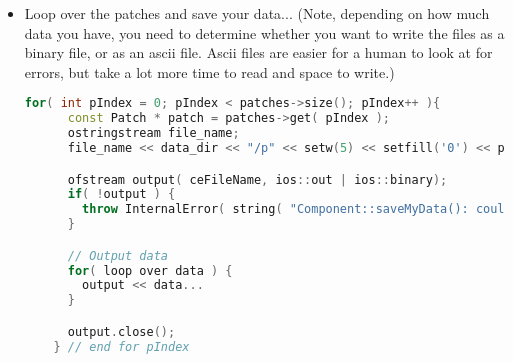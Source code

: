 \begin{itemize}
\item Loop over the patches and save your data... (Note, depending on
  how much data you have, you need to determine whether you want to
  write the files as a binary file, or as an ascii file.  Ascii files
  are easier for a human to look at for errors, but take a lot more
  time to read and space to write.)
  \begin{lstlisting}[language=Cpp]
    for( int pIndex = 0; pIndex < patches->size(); pIndex++ ){
      const Patch * patch = patches->get( pIndex );
      ostringstream file_name;
      file_name << data_dir << "/p" << setw(5) << setfill('0') << pIndex;

      ofstream output( ceFileName, ios::out | ios::binary);
      if( !output ) {
        throw InternalError( string( "Component::saveMyData(): couldn't open file '") + file_name.str() + "'.", __FILE__, __LINE__);        
      }

      // Output data
      for( loop over data ) {
        output << data...
      }

      output.close();
    } // end for pIndex
  \end{lstlisting}

\end{itemize}

